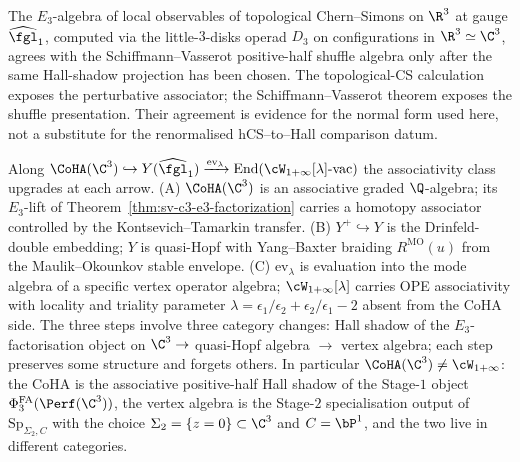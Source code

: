 \begin{remark}
\label{rem:sv-c3-cfg-parallel}
The $E_3$-algebra of local observables of topological Chern--Simons
on $\R^3$ at gauge $\widehat{\fgl}_1$, computed via the little-$3$-disks
operad $D_3$ on configurations in $\R^3 \simeq \C^3$, agrees with the
Schiffmann--Vasserot positive-half shuffle algebra only after the same
Hall-shadow projection has been chosen. The topological-CS calculation
exposes the perturbative associator; the Schiffmann--Vasserot theorem
exposes the shuffle presentation. Their agreement is evidence for the
normal form used here, not a substitute for the renormalised
hCS--to--Hall comparison datum.
\end{remark}

\begin{remark}
\label{rem:sv-c3-three-associativity-classes}
Along $\CoHA(\C^3) \hookrightarrow Y(\widehat{\fgl}_1)
\xrightarrow{\mathrm{ev}_\lambda} \mathrm{End}(\cW_{1+\infty}[\lambda]
\text{-vac})$ the associativity class upgrades at each arrow.
(A) $\CoHA(\C^3)$ is an associative graded $\Q$-algebra; its
$E_3$-lift of Theorem~\ref{thm:sv-c3-e3-factorization} carries a
homotopy associator controlled by the Kontsevich--Tamarkin transfer.
(B) $Y^+ \hookrightarrow Y$ is the Drinfeld-double embedding; $Y$ is
quasi-Hopf with Yang--Baxter braiding $R^{\mathrm{MO}}(u)$ from the
Maulik--Okounkov stable envelope. (C) $\mathrm{ev}_\lambda$ is
evaluation into the mode algebra of a specific vertex operator
algebra; $\cW_{1+\infty}[\lambda]$ carries OPE associativity with
locality and triality parameter $\lambda = \epsilon_1 / \epsilon_2 +
\epsilon_2 / \epsilon_1 - 2$ absent from the CoHA side. The three
steps involve three category changes: Hall shadow of the $E_3$-factorisation object on $\C^3 \to$
quasi-Hopf algebra $\to$ vertex algebra; each step preserves some
structure and forgets others. In particular $\CoHA(\C^3) \neq
\cW_{1+\infty}$: the CoHA is the associative positive-half Hall
shadow of the Stage-$1$ object $\PhiFA_3(\Perf(\C^3))$, the vertex algebra is the Stage-$2$
specialisation output of $\mathrm{Sp}_{\Sigma_2, C}$ with the choice
$\Sigma_2 = \{z = 0\} \subset \C^3$ and $C = \bP^1$, and the two live
in different categories.
\end{remark}

